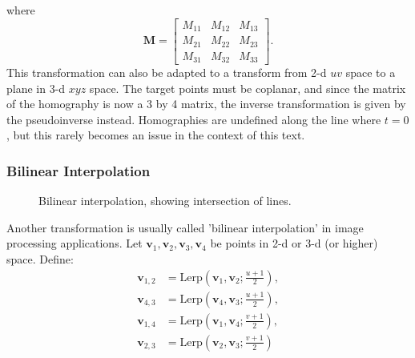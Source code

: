 \documentclass{amsart}[12pt]
\begin{document}
where
\begin{equation}
  \mathbf{M} = \begin{bmatrix}
  M_{11} & M_{12} & M_{13} \\
  M_{21} & M_{22} & M_{23} \\
  M_{31} & M_{32} & M_{33} \end{bmatrix}.
\end{equation}
This transformation can also be adapted to a transform from 2-d $uv$ space to a
plane in 3-d $xyz$ space. The target points must be coplanar, and since the
matrix of the homography is now a 3 by 4 matrix, the inverse transformation is
given by the pseudoinverse instead. Homographies are undefined along the line
where $t=0$, but this rarely becomes an issue in the context of this text.

\subsubsection{Bilinear Interpolation}
\begin{figure}%
\caption{Bilinear interpolation, showing intersection of lines.}
\label{fig:uv}
\end{figure}
Another transformation is usually called 'bilinear interpolation' in image processing applications. Let $\mathbf v_1, \mathbf v_2, \mathbf v_3, \mathbf v_4$ be points in 2-d or 3-d (or higher) space. Define:
\begin{equation}\begin{split}
\mathbf v_{1,2} & = \mathrm{Lerp}(\mathbf v_1,\mathbf v_2;\frac{u+1}{2}),\\
\mathbf v_{4,3} & = \mathrm{Lerp}(\mathbf v_4,\mathbf v_3;\frac{u+1}{2}),\\
\mathbf v_{1,4} & = \mathrm{Lerp}(\mathbf v_1,\mathbf v_4;\frac{v+1}{2}),\\
\mathbf v_{2,3} & = \mathrm{Lerp}(\mathbf v_2,\mathbf v_3;\frac{v+1}{2})
\end{split}\end{equation}
\end{document}
